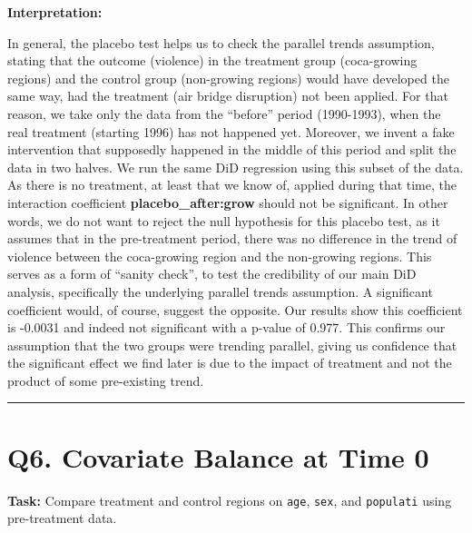 \documentclass[
]{article}
\begin{document}
\textbf{Interpretation:}

In general, the placebo test helps us to check the parallel trends
assumption, stating that the outcome (violence) in the treatment group
(coca-growing regions) and the control group (non-growing regions) would
have developed the same way, had the treatment (air bridge disruption)
not been applied. For that reason, we take only the data from the
``before'' period (1990-1993), when the real treatment (starting 1996)
has not happened yet. Moreover, we invent a fake intervention that
supposedly happened in the middle of this period and split the data in
two halves. We run the same DiD regression using this subset of the
data. As there is no treatment, at least that we know of, applied during
that time, the interaction coefficient \textbf{placebo\_after:grow}
should not be significant. In other words, we do not want to reject the
null hypothesis for this placebo test, as it assumes that in the
pre-treatment period, there was no difference in the trend of violence
between the coca-growing region and the non-growing regions. This serves
as a form of ``sanity check'', to test the credibility of our main DiD
analysis, specifically the underlying parallel trends assumption. A
significant coefficient would, of course, suggest the opposite. Our
results show this coefficient is -0.0031 and indeed not significant with
a p-value of 0.977. This confirms our assumption that the two groups
were trending parallel, giving us confidence that the significant effect
we find later is due to the impact of treatment and not the product of
some pre-existing trend.

\begin{center}\rule{0.5\linewidth}{0.5pt}\end{center}

\section{Q6. Covariate Balance at Time
0}\label{q6.-covariate-balance-at-time-0}

\textbf{Task:} Compare treatment and control regions on \texttt{age},
\texttt{sex}, and \texttt{populati} using pre-treatment data.
\end{document}
